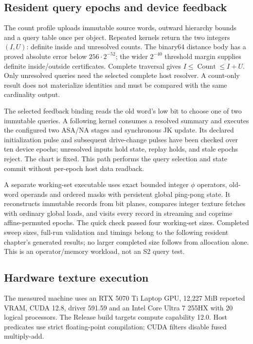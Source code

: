 \subsection{Resident query epochs and device feedback}
The count profile uploads immutable source words, outward hierarchy bounds
and a query table once per object. Repeated kernels return the two integers
$(I,U)$: definite inside and unresolved counts. The binary64 distance body has
a proved absolute error below $256\cdot2^{-52}$; the wider $2^{-40}$ threshold
margin supplies definite inside/outside certificates. Complete traversal gives
$I\le\operatorname{Count}\le I+U$. Only unresolved queries need the selected
complete host resolver. A count-only result does not materialize identities
and must be compared with the same cardinality output.

The selected feedback binding reads the old word's low bit to choose one of
two immutable queries. A following kernel consumes a resolved summary and
executes the configured two ASA/NA stages and synchronous JK update. Its
declared initialization pulse and subsequent drive-change pulses have been
checked over ten device epochs; unresolved inputs hold state, replay holds,
and stale epochs reject. The chart is fixed. This path performs the query
selection and state commit without per-epoch host data readback.

A separate working-set executable uses exact bounded integer $\phi$ operators,
old-word operands and ordered masks with persistent global ping-pong state.
It reconstructs immutable records from bit planes, compares integer texture
fetches with ordinary global loads, and visits every record in streaming and
coprime affine-permuted epochs. The quick check passed four working-set sizes.
Completed sweep sizes, full-run validation and timings belong to the following
resident chapter's generated results; no larger completed size follows from
allocation alone. This is an operator/memory workload, not an S2 query test.

\subsection{Hardware texture execution}
The measured machine uses an RTX 5070 Ti Laptop GPU, 12,227 MiB reported VRAM,
CUDA 12.8, driver 591.59 and an Intel Core Ultra 7 255HX with 20 logical
processors. The Release build targets compute capability 12.0. Host predicates
use strict floating-point compilation; CUDA filters disable fused multiply-add.

